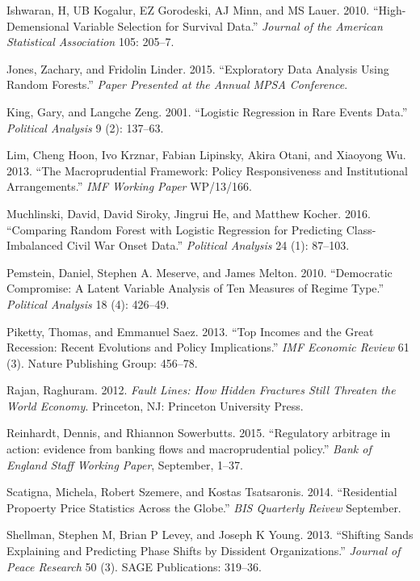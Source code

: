 \documentclass[]{article}
\begin{document}
\hypertarget{ref-Ishwaran2010}{}
Ishwaran, H, UB Kogalur, EZ Gorodeski, AJ Minn, and MS Lauer. 2010.
``High-Demensional Variable Selection for Survival Data.'' \emph{Journal
of the American Statistical Association} 105: 205--7.

\hypertarget{ref-jones2015}{}
Jones, Zachary, and Fridolin Linder. 2015. ``Exploratory Data Analysis
Using Random Forests.'' \emph{Paper Presented at the Annual MPSA
Conference}.

\hypertarget{ref-king2001logistic}{}
King, Gary, and Langche Zeng. 2001. ``Logistic Regression in Rare Events
Data.'' \emph{Political Analysis} 9 (2): 137--63.

\hypertarget{ref-lim2013}{}
Lim, Cheng Hoon, Ivo Krznar, Fabian Lipinsky, Akira Otani, and Xiaoyong
Wu. 2013. ``The Macroprudential Framework: Policy Responsiveness and
Institutional Arrangements.'' \emph{IMF Working Paper} WP/13/166.

\hypertarget{ref-Muchlinski2016}{}
Muchlinski, David, David Siroky, Jingrui He, and Matthew Kocher. 2016.
``Comparing Random Forest with Logistic Regression for Predicting
Class-Imbalanced Civil War Onset Data.'' \emph{Political Analysis} 24
(1): 87--103.

\hypertarget{ref-Pemstein2010}{}
Pemstein, Daniel, Stephen A. Meserve, and James Melton. 2010.
``Democratic Compromise: A Latent Variable Analysis of Ten Measures of
Regime Type.'' \emph{Political Analysis} 18 (4): 426--49.

\hypertarget{ref-piketty2013top}{}
Piketty, Thomas, and Emmanuel Saez. 2013. ``Top Incomes and the Great
Recession: Recent Evolutions and Policy Implications.'' \emph{IMF
Economic Review} 61 (3). Nature Publishing Group: 456--78.

\hypertarget{ref-rajan2012fault}{}
Rajan, Raghuram. 2012. \emph{Fault Lines: How Hidden Fractures Still
Threaten the World Economy}. Princeton, NJ: Princeton University Press.

\hypertarget{ref-dReinhardt2015}{}
Reinhardt, Dennis, and Rhiannon Sowerbutts. 2015. ``Regulatory arbitrage
in action: evidence from banking flows and macroprudential policy.''
\emph{Bank of England Staff Working Paper}, September, 1--37.

\hypertarget{ref-bis2014}{}
Scatigna, Michela, Robert Szemere, and Kostas Tsatsaronis. 2014.
``Residential Propoerty Price Statistics Across the Globe.'' \emph{BIS
Quarterly Reivew} September.

\hypertarget{ref-shellman2013shifting}{}
Shellman, Stephen M, Brian P Levey, and Joseph K Young. 2013. ``Shifting
Sands Explaining and Predicting Phase Shifts by Dissident
Organizations.'' \emph{Journal of Peace Research} 50 (3). SAGE
Publications: 319--36.
\end{document}
